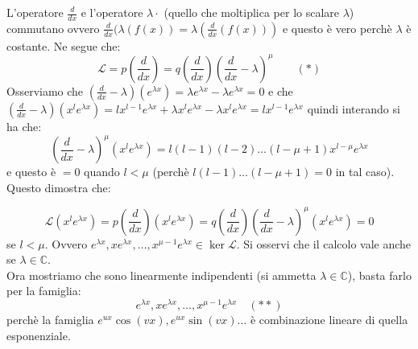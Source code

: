 \documentclass[a4paper,11pt,titlepage]{book}
\begin{document}
L'operatore $\frac{d}{dx}$ e l'operatore $\lambda\cdot$ (quello che moltiplica per lo scalare $\lambda$) commutano ovvero $\frac{d}{dx}(\lambda(f(x))=\lambda(\frac{d}{dx}(f(x)))$ e questo è vero perchè $\lambda$ è costante. Ne segue che:
$$\mathcal{L}=p\left(\frac{d}{dx}\right)=q\left(\frac{d}{dx}\right)\left(\frac{d}{dx}-\lambda\right)^\mu\qquad(*)$$
Osserviamo che $\left(\frac{d}{dx}-\lambda\right)(e^{\lambda x})=\lambda e^{\lambda x}-\lambda e^{\lambda x}=0$ e che $\left(\frac{d}{dx}-\lambda\right)(x^l e^{\lambda x})=lx^{l-1}e^{\lambda x}+\lambda x^le^{\lambda x}-\lambda x^l e^{\lambda x}=lx^{l-1}e^{\lambda x}$ quindi interando si ha che:
$$\left(\frac{d}{dx}-\lambda\right)^\mu(x^l e^{\lambda x})=l(l-1)(l-2)\ldots(l-\mu+1)x^{l-\mu}e^{\lambda x}$$
e questo è $=0$ quando $l<\mu$ (perchè $l(l-1)\ldots(l-\mu+1)=0$ in tal caso). Questo dimostra che:

$$\mathcal{L}(x^le^{\lambda x})=p\left(\frac{d}{dx}\right)(x^le^{\lambda x})=q\left(\frac{d}{dx}\right)\left(\frac{d}{dx}-\lambda\right)^\mu(x^le^{\lambda x})=0$$
se $l<\mu$. Ovvero $e^{\lambda x},xe^{\lambda x},\ldots,x^{\mu-1}e^{\lambda x}\in\ker\mathcal{L}$. Si osservi che il calcolo vale anche se $\lambda\in\mathbb{C}$.\\

Ora mostriamo che sono linearmente indipendenti (si ammetta $\lambda\in\mathbb{C}$), basta farlo per la famiglia:
$$e^{\lambda x},xe^{\lambda x},\ldots,x^{\mu-1}e^{\lambda x}\quad(**)$$
perchè la famiglia $e^{ux}\cos(vx),e^{ux}\sin(vx)\ldots$ è combinazione lineare di quella esponenziale.\\
\end{document}
